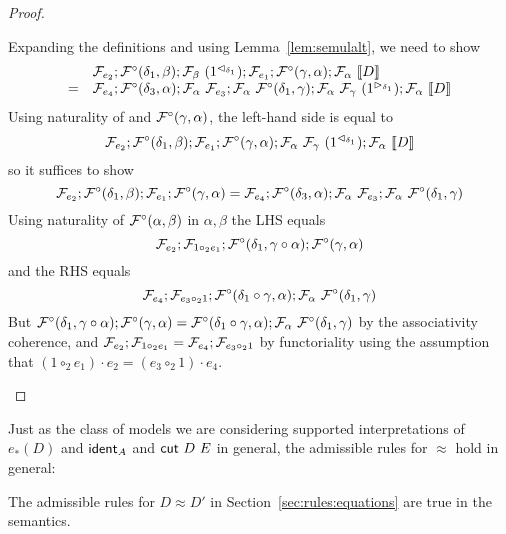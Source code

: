 \documentclass{drl-common/llncs}
\renewcommand{\sem}[1]{\ensuremath{ \llbracket #1 \rrbracket}}
\newcommand\compo[2]{\ensuremath{#1 \circ #2}}
\newcommand\compv[2]{\ensuremath{#1 \cdot #2}}
\newcommand\comph[2]{\ensuremath{#1 \mathbin{\circ_2} #2}}
\newcommand\tr[2]{\ensuremath{{{#1}_{*}(#2)}}}
\newcommand\ident[1]{\ensuremath{\dsd{ident}_{#1}}}
\newcommand\cutsym{\ensuremath{\dsd{cut}}}
\newcommand\cut[2]{\ensuremath{{\cutsym \,\, #1 \,\, #2}}}
\newcommand\ap[2]{\ensuremath{#1 \approx #2}}
\begin{document}
\begin{proof}
\begin{itemize}
Expanding the definitions and using Lemma~\ref{lem:semulalt}, we need to show
\[
\begin{array}{ll}
  & \semFo{e_2};\semFcomp(\delta_1,\beta);\semF{\beta}{(\semrtol{1}{\delta_1})};\semFo{e_1}  ; \semFcomp(\gamma,\alpha) ; \semF{\alpha}{\sem D}\\
= & \semFo{e_4};\semFcomp(\delta_3,\alpha);\semF{\alpha}{\semFo{e_3}};\semF{\alpha}{\semFcomp(\delta_1,\gamma)};\semF{\alpha}{\semF{\gamma}{(\semltor{1}{\delta_1})}};\semF{\alpha}{\sem{D}}
\end{array}
\]
Using naturality of  and $\mathcal{F}^\circ(\gamma,\alpha)$, the
left-hand side is equal to
\[
\semFo{e_2};\semFcomp(\delta_1,\beta);\semFo{e_1};\semFcomp(\gamma,\alpha);\semF{\alpha}{\semF{\gamma}{(\semrtol{1}{\delta_1})}};\semF{\alpha}{\sem D}
\]
so it suffices to show
\[
{\mathcal{F}_{e_2}};\mathcal{F}^\circ(\delta_1,\beta);{\mathcal{F}_{e_1}};\mathcal{F}^\circ(\gamma,\alpha)
= {\mathcal{F}_{e_4}};\mathcal{F}^\circ(\delta_3,\alpha);\mathcal{F}_{\alpha} \,\, {\mathcal{F}_{e_3}};\mathcal{F}_{\alpha} \,\, \mathcal{F}^\circ(\delta_1,\gamma)
\]
Using naturality of $\mathcal{F}^\circ(\alpha,\beta)$ in $\alpha,\beta$ the LHS equals
\[
\semFo{e_2};\semFo{\comph{1}{e_1}};\semFcomp(\delta_1,\compo{\gamma}{\alpha});\semFcomp(\gamma,\alpha)
\]
and the RHS equals
\[
\semFo{e_4};\semFo{\comph{e_3}{1}};\semFcomp(\compo{\delta_1}{\gamma},\alpha);\semF{\alpha}{\semFcomp(\delta_1,\gamma)}
\]
But $\semFcomp(\delta_1,\compo{\gamma}{\alpha});\semFcomp(\gamma,\alpha) = \semFcomp(\compo{\delta_1}{\gamma},\alpha);\semF{\alpha}{\semFcomp(\delta_1,\gamma)}$
by the associativity coherence, and 
$\semFo{e_2};\semFo{\comph{1}{e_1}} =
\semFo{e_4};\semFo{\comph{e_3}{1}}$
by functoriality using the assumption that 
${\compv{(\comph{1}{e_1})}{e_2} = {\compv{(\comph{e_3}{1})}{e_4}}}$.  

\end{itemize}
\end{proof}

Just as the class of models we are considering supported interpretations
of \tr{e}{D} and \ident{A} and \cut{D}{E} in general, the admissible
rules for \ap{}{} hold in general:

\begin{theorem} 
The admissible rules for \ap{D}{D'} in Section~\ref{sec:rules:equations}
are true in the semantics.  
\end{theorem}
\end{document}
